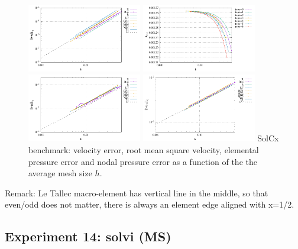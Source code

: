 \begin{figure}
\centering
\includegraphics[width=5cm]{python_codes/fieldstone_78/results/errors_u_exp13}
\includegraphics[width=5cm]{python_codes/fieldstone_78/results/vrms_exp13} \\
\includegraphics[width=5cm]{python_codes/fieldstone_78/results/errors_p_exp13}
\includegraphics[width=5cm]{python_codes/fieldstone_78/results/errors_q1_exp13}
{\captionfont SolCx benchmark: velocity error, 
root mean square velocity, elemental pressure error and nodal pressure error
as a function of the the average mesh size $h$.} 
\end{figure}



Remark: Le Tallec macro-element has vertical line in the middle, so that 
even/odd does not matter, there is always an element edge aligned with x=1/2.



\newpage
\subsection*{Experiment 14: solvi (MS)}

